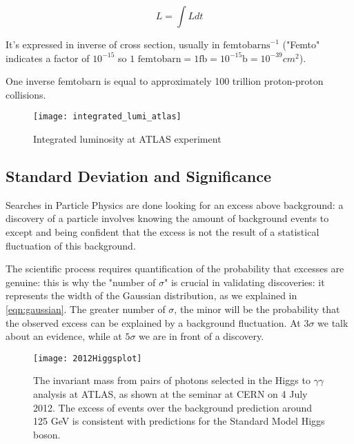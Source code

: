 \begin{equation}
	L = \int Ldt
\end{equation}

It's expressed in inverse of cross section, usually in $\text{femtobarns}^{-1}$ ("Femto" indicates a factor of $10^{-15}$ so $\text{1 femtobarn} = 1 \text{fb} = 10^{-15} \text{b} = 10^{-39} cm^2 $).

One inverse femtobarn is equal to approximately 100 trillion proton-proton collisions.

\begin{figure}
	\centerline{
		\texttt{[image: integrated\_lumi\_atlas]}}
	\caption{Integrated luminosity at ATLAS experiment \cite{Bruce:2016iew}}
\end{figure}

\subsection{Standard Deviation and Significance}

Searches in Particle Physics are done looking for an excess above background: a discovery of a particle involves knowing the amount of background events to except and being confident that the excess is not the result of a statistical fluctuation of this background.


The scientific process requires quantification of the probability that excesses are genuine: this is why the "number of $\sigma$" is crucial in validating discoveries: it represents the width of the Gaussian distribution, as we explained in \ref{eqn:gaussian}. The greater number of $\sigma$, the minor will be the probability that the observed excess can be explained by a background fluctuation.
At $3\sigma$ we talk about an evidence, while at $5\sigma$ we are in front of a discovery.

\begin{figure}
	\centerline{
		\texttt{[image: 2012Higgsplot]}}
	\caption{The invariant mass from pairs of photons selected in the Higgs to $\gamma\gamma$ analysis at ATLAS, as shown at the seminar at CERN on 4 July 2012. The excess of events over the background prediction around 125 GeV is consistent with predictions for the Standard Model Higgs boson.\cite{Collaboration:2627611}}
\end{figure}

